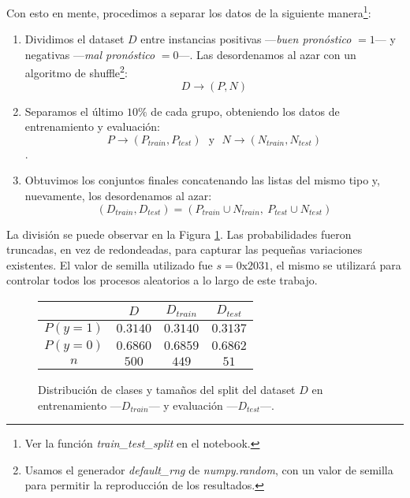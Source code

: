 Con esto en mente, procedimos a separar los datos de la siguiente manera\footnote{Ver la función \textit{train\_test\_split} en el notebook.}:

\begin{enumerate}
    \item Dividimos el dataset $D$ entre instancias positivas ---\textit{buen pronóstico} $=1$--- y negativas ---\textit{mal pronóstico} $=0$---. Las desordenamos al azar con un algoritmo de shuffle\footnote{Usamos el generador \textit{default\_rng} de \textit{numpy.random}, con un valor de semilla para permitir la reproducción de los resultados.}: $$D \rightarrow (P, N)$$
    \item Separamos el último $10\%$ de cada grupo, obteniendo los datos de entrenamiento y evaluación: $$P \rightarrow (P_{train}, P_{test})\ \ \ \text{y}\ \ \ N \rightarrow (N_{train}, N_{test})$$.
    \item Obtuvimos los conjuntos finales concatenando las listas del mismo tipo y, nuevamente, los desordenamos al azar: $$(D_{train}, D_{test}) = (P_{train} \cup N_{train},\ P_{test} \cup N_{test})$$
\end{enumerate}

\vspace{0.5em}
La división se puede observar en la Figura \ref{distribucion}. Las probabilidades fueron truncadas, en vez de redondeadas, para capturar las pequeñas variaciones existentes. El valor de semilla utilizado fue $s = \text{0x2031}$, el mismo se utilizará para controlar todos los procesos aleatorios a lo largo de este trabajo.

\vspace{0.5em}
\begin{figure}[!htbp]
    \begin{center}
        \begin{tabular}{ |c|c|c|c| } 
         \hline
                    & $D$      & $D_{train}$ & $D_{test}$ \\
        \hline
        $P(y=1)$   & $0.3140$ & $0.3140$    & $0.3137$   \\ 
        $P(y=0)$   & $0.6860$ & $0.6859$    & $0.6862$   \\ 
        $n$        & $500$    & $449$       & $51$       \\ 
        \hline
        \end{tabular}
    \end{center}
    \caption{Distribución de clases y tamaños del split del dataset $D$ en entrenamiento ---$D_{train}$--- y evaluación ---$D_{test}$---.} \label{distribucion}
\end{figure}
